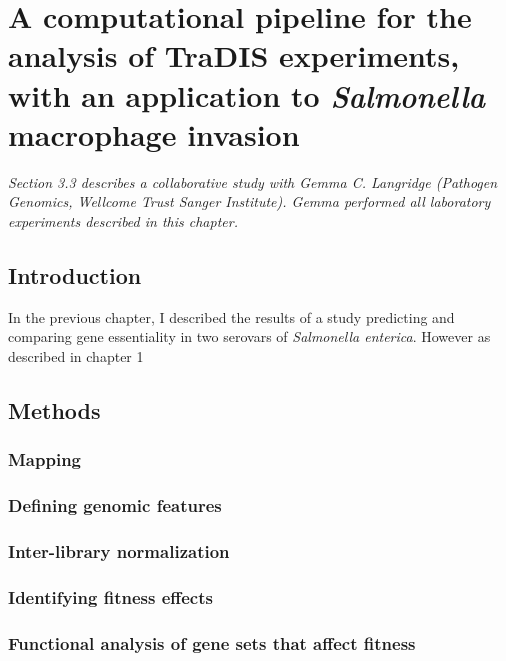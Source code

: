 
\chapter{A computational pipeline for the analysis of TraDIS experiments, with an application to {\it Salmonella} macrophage invasion}
\label{sec:chapterPingpong}
\ifpdf
    \graphicspath{{Chapter3/Chapter3Figs/EPS/}{Chapter3/Chapter3Figs/}}
\fi

\textit{Section 3.3 describes a collaborative study with Gemma C. Langridge (Pathogen Genomics, Wellcome Trust Sanger Institute). Gemma performed all laboratory experiments described in this chapter.}

\section{Introduction}

In the previous chapter, I described the results of a study predicting and comparing gene essentiality in two serovars of \textit{Salmonella enterica}. However as described in chapter 1

\section{Methods}

\subsection{Mapping}

\subsection{Defining genomic features}

\subsection{Inter-library normalization}

\subsection{Identifying fitness effects}

\subsection{Functional analysis of gene sets that affect fitness}


